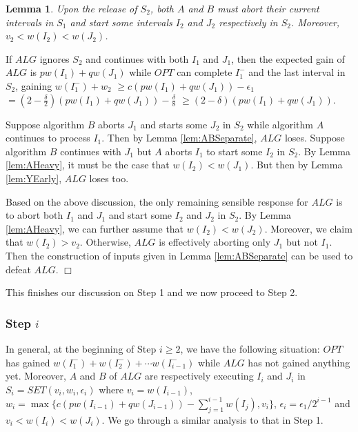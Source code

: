 \documentclass[11pt]{article}
\newtheorem{lemma}{Lemma}[section]
\newcommand{\qed}{\hspace*{\fill}$\Box$\par\medskip}
\newenvironment{proof}{\noindent{\it Proof. }\ignorespaces}{\qed}
\begin{document}
\begin{lemma} \label{lem:mustmoveon}
Upon the release of $S_2$, 
both $A$ and $B$ must abort their current intervals in $S_1$
and start some intervals $I_2$ and $J_2$ respectively in $S_2$.
Moreover, $v_2 < w(I_2) < w(J_2)$.
\end{lemma}
\begin{proof}
If $ALG$ ignores $S_2$ and continues with both $I_1$ and $J_1$,
then the expected gain of $ALG$ is $pw(I_1) + qw(J_1)$
while $OPT$ can complete $I^-_1$ and the last interval in $S_2$,
gaining $w(I^-_1) + w_2$ $\geq c(pw(I_1) + qw(J_1)) - \epsilon_1$ 
$= (2-\frac{\delta}{2}) (p w(I_1) + q w(J_1)) - \frac{\delta}{8}$
$\geq (2-\delta) (p w(I_1) + q w(J_1))$.

Suppose algorithm $B$ aborts $J_1$ and starts some $J_2$ in
$S_2$ while algorithm $A$ continues to process $I_1$.
Then by Lemma \ref{lem:ABSeparate}, $ALG$ loses.
Suppose algorithm $B$ continues with $J_1$ but 
$A$ aborts $I_1$ to start some $I_2$ in $S_2$.
By Lemma \ref{lem:AHeavy}, it must be the case that
$w(I_2) <w(J_1)$.
But then by Lemma \ref{lem:YEarly}, $ALG$ loses too.

Based on the above discussion, 
the only remaining sensible response for $ALG$
is to abort both $I_1$ and $J_1$
and start some $I_2$ and $J_2$ in $S_2$.
By Lemma \ref{lem:AHeavy},
we can further assume that $w(I_2) < w(J_2)$.
Moreover, we claim that $w(I_2) > v_2$.
Otherwise, $ALG$ is effectively aborting only $J_1$ but not $I_1$.
Then the construction of inputs given in Lemma \ref{lem:ABSeparate}
can be used to defeat $ALG$.
\end{proof}

This finishes our discussion on Step 1 and we now proceed to Step 2.

\subsubsection{Step $i$}

In general, at the beginning of Step $i \geq 2$,
we have the following situation:
$OPT$ has gained $w(I_1^-) + w(I_2^-) + \cdots w(I_{i-1}^-)$
while $ALG$ has not gained anything yet.
Moreover, $A$ and $B$ of $ALG$ 
are respectively executing $I_{i}$ and $J_{i}$
in $S_i = SET(v_i,w_i,\epsilon_i)$ 
where $v_i = w(I_{i-1})$, 
$w_i = \max\{ c(p w(I_{i-1}) + q w(J_{i-1})) - \sum_{j=1}^{i-1} w(I_j), v_i \}$,
$\epsilon_i = \epsilon_1/2^{i-1}$
and $v_i < w(I_i) < w(J_i)$.
We go through a similar analysis to that in Step 1.
\end{document}
